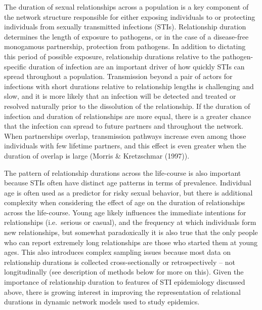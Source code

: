 \documentclass [11pt, proquest] {uwthesis}[2015/03/03]
\begin{document}
The duration of sexual relationships across a population is a key component of the network structure responsible for either exposing individuals to or protecting individuals from sexually transmitted infections (STIs). Relationship duration determines the length of exposure to pathogens, or in the case of a disease-free monogamous partnership, protection from pathogens. In addition to dictating this period of possible exposure, relationship durations relative to the pathogen-specific duration of infection are an important driver of how quickly STIs can spread throughout a population. Transmission beyond a pair of actors for infections with short durations relative to relationship lengths is challenging and slow, and it is more likely that an infection will be detected and treated or resolved naturally prior to the dissolution of the relationship. If the duration of infection and duration of relationships are more equal, there is a greater chance that the infection can spread to future partners and throughout the network. When partnerships overlap, transmission pathways increase even among those individuals with few lifetime partners, and this effect is even greater when the duration of overlap is large (Morris \& Kretzschmar (1997)).

The pattern of relationship durations across the life-course is also important because STIs often have distinct age patterns in terms of prevalence. Individual age is often used as a predictor for risky sexual behavior, but there is additional complexity when considering the effect of age on the duration of relationships across the life-course. Young age likely influences the immediate intentions for relationships (i.e.~serious or casual), and the frequency at which individuals form new relationships, but somewhat paradoxically it is also true that the only people who can report extremely long relationships are those who started them at young ages. This also introduces complex sampling issues because most data on relationship durations is collected cross-sectionally or retrospectively -- not longitudinally (see description of methods below for more on this). Given the importance of relationship duration to features of STI epidemiology discussed above, there is growing interest in improving the representation of relational durations in dynamic network models used to study epidemics.
\end{document}
